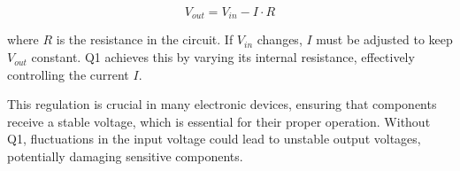 \[ V_{out} = V_{in} - I \cdot R \]

where \( R \) is the resistance in the circuit. If \( V_{in} \) changes, \( I \) must be adjusted to keep \( V_{out} \) constant. Q1 achieves this by varying its internal resistance, effectively controlling the current \( I \).

This regulation is crucial in many electronic devices, ensuring that components receive a stable voltage, which is essential for their proper operation. Without Q1, fluctuations in the input voltage could lead to unstable output voltages, potentially damaging sensitive components.


